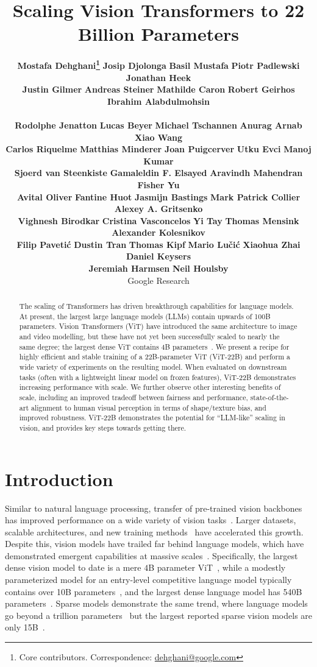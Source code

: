 \documentclass{article}
\title{
\vspace{-10mm}
\textbf{
Scaling Vision Transformers to 22 Billion Parameters
}
\vspace{-3mm}
  }
\author{
\normalsize{}
\textbf{Mostafa Dehghani\thanks{Core contributors. Correspondence: \url{dehghani@google.com}}} \hspace{5mm} 
\textbf{Josip Djolonga\footnotemark[1]} \hspace{3mm} 
\textbf{Basil Mustafa\footnotemark[1]} \hspace{3mm} 
\textbf{Piotr Padlewski\footnotemark[1]} \hspace{3mm} 
\textbf{Jonathan Heek\footnotemark[1]} 
\\
\normalsize{}
\textbf{Justin Gilmer} \hspace{3mm} 
\textbf{Andreas Steiner} \hspace{3mm} 
\textbf{Mathilde Caron} \hspace{3mm} 
\textbf{Robert Geirhos} \hspace{3mm} 
\textbf{Ibrahim  Alabdulmohsin}

\\
\normalsize{}
\textbf{Rodolphe Jenatton} \hspace{3mm} 
\textbf{Lucas Beyer} \hspace{3mm} 
\textbf{Michael Tschannen} \hspace{3mm} 
\textbf{Anurag Arnab} \hspace{3mm} 
\textbf{Xiao Wang}
\\
\normalsize{}
\textbf{Carlos Riquelme} \hspace{3mm} 
\textbf{Matthias Minderer} \hspace{3mm} 
\textbf{Joan Puigcerver} \hspace{3mm} 
\textbf{Utku Evci} \hspace{3mm} 
\textbf{Manoj Kumar}
\\
\normalsize{}
\textbf{Sjoerd van Steenkiste} \hspace{3mm} 
\textbf{Gamaleldin F. Elsayed} \hspace{3mm} 
\textbf{Aravindh Mahendran} \hspace{3mm} 
\textbf{Fisher Yu}
\\
\normalsize{}
\textbf{Avital Oliver} \hspace{3mm} 
\textbf{Fantine Huot} \hspace{3mm} 
\textbf{Jasmijn Bastings} \hspace{3mm} 
\textbf{Mark Patrick Collier} \hspace{3mm} 
\textbf{Alexey A. Gritsenko}
\\
\normalsize{}
\textbf{Vighnesh Birodkar} \hspace{3mm} 
\textbf{Cristina Vasconcelos} \hspace{3mm} 
\textbf{Yi Tay} \hspace{3mm} 
\textbf{Thomas Mensink} \hspace{3mm} 
\textbf{Alexander Kolesnikov}
\\
\normalsize{}
\textbf{Filip Pavetić} \hspace{3mm} 
\textbf{Dustin Tran} \hspace{3mm} 
\textbf{Thomas Kipf} \hspace{3mm} 
\textbf{Mario Lučić} \hspace{3mm} 
\textbf{Xiaohua Zhai} \hspace{3mm} 
\textbf{Daniel Keysers}
\\
\normalsize{}
\textbf{Jeremiah Harmsen} \hspace{3mm} 
\textbf{Neil Houlsby\footnotemark[1]}
\\ 
\vspace{7mm}
\normalsize{}
Google Research
\vspace{-7mm}
}
\date{}
\newcommand{\chonk}{\mbox{ViT-22B}\xspace}
\begin{document}
\setlength{\abovedisplayskip}{4pt}
\setlength{\belowdisplayskip}{4pt}
\setlength{\abovedisplayshortskip}{0pt}
\setlength{\belowdisplayshortskip}{0pt}

\doparttoc 
\faketableofcontents 
\maketitle

\begin{abstract}

The scaling of Transformers has driven breakthrough capabilities for language models.
At present, the largest large language models (LLMs) contain upwards of 100B parameters.
Vision Transformers (ViT) have introduced the same architecture to image and video modelling, but these have not yet been successfully scaled to nearly the same degree; the largest dense ViT contains 4B parameters~\citep{chen2022pali}.
We present a recipe for highly efficient and stable training of a 22B-parameter ViT (\chonk) and perform a wide variety of experiments on the resulting model.
When evaluated on downstream tasks (often with a lightweight linear model on frozen features), \chonk demonstrates increasing performance with scale.
We further observe other interesting benefits of scale, including an improved tradeoff between fairness and performance, state-of-the-art alignment to human visual perception in terms of shape/texture bias, and improved robustness.
\chonk demonstrates the potential for ``LLM-like'' scaling in vision, and provides key steps towards getting there.
\end{abstract}

\section{Introduction}
Similar to natural language processing, transfer of pre-trained vision backbones has improved performance on a wide variety of vision tasks~\citep{pan2009survey,zhai2019large,kolesnikov2020big}.
Larger datasets, scalable architectures, and new training methods~\citep{mahajan2018exploring,dosovitskiy2020image,clip,zhai2022scaling} have accelerated this growth. Despite this, vision models have trailed far behind language models, which have demonstrated emergent capabilities at massive scales~\citep{chowdhery2022palm, wei2022emergent}. Specifically, the largest dense vision model to date is a mere $4$B parameter ViT~\citep{chen2022pali}, while a modestly parameterized model for an entry-level competitive language model typically contains over 10B parameters~\citep{t5paper,tay2022unifying,chung2022scaling}, and the largest dense language model has 540B parameters~\citep{chowdhery2022palm}. Sparse models demonstrate the same trend, where language models go beyond a trillion parameters~\citep{fedus2021switch} but the largest reported sparse vision models are only 15B~\citep{riquelme2021scaling}.
\end{document}
